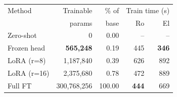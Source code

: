\begin{tabular}{lrrrr}
\toprule
Method & Trainable & \% of & \multicolumn{2}{c}{Train time (s)} \\
 & params & base & Ro & El \\
\midrule
Zero-shot & 0 & 0.00 & -- & -- \\
Frozen head & \textbf{565{,}248} & 0.19 & 445 & \textbf{346} \\
LoRA (r=8) & 1{,}187{,}840 & 0.39 & 626 & 892 \\
LoRA (r=16) & 2{,}375{,}680 & 0.78 & 472 & 889 \\
Full FT & 300{,}768{,}256 & 100.00 & \textbf{444} & 669 \\
\bottomrule
\end{tabular}
